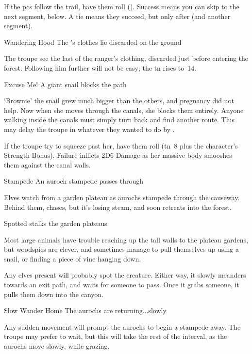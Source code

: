 If the \glspl{pc} follow the trail, have them roll  (\tn[10]).
Success means you can skip to the next \gls{segment}, below.
A tie means they succeed, but only after  (and another \gls{segment}).

{Wandering Hood}%
{The 's clothes lie discarded on the ground}%

The troupe see the last of the ranger's clothing, discarded just before entering the forest.
Following him further will not be easy; the \gls{tn} rises to~14.


{Excuse Me!}%
{A giant snail blocks the path}%

`Brownie' the snail grew much bigger than the others, and pregnancy did not help.
Now when she moves through the canals, she blocks them entirely.
Anyone walking inside the canals must simply turn back and find another route.
This may delay the troupe in whatever they wanted to do by .

If the troupe try to squeeze past her, have them roll  (\gls{tn}~8 plus the character's Strength Bonus).
Failure inflicts 2D6 Damage as her massive body smooshes them against the canal walls.

{Stampede}%
{An auroch stampede passes through}%

Elves watch from a garden plateau as aurochs stampede through the causeway.
Behind them,  chases, but it's losing steam, and soon retreats into the forest.

{ Spotted}%
{ stalks the garden plateaus}%

Most large animals have trouble reaching up the tall walls to the plateau gardens, but woodspies are clever, and sometimes manage to pull themselves up using a snail, or finding a piece of vine hanging down.

Any elves present will probably spot the creature.
Either way, it slowly meanders towards an exit path, and waits for someone to pass.
Once it grabs someone, it pulls them down into the canyon.

{Slow Wander Home}%
{The aurochs are returning...slowly}%

Any sudden movement will prompt the aurochs to begin a stampede away.
The troupe may prefer to wait, but this will take the rest of the \gls{interval}, as the aurochs move slowly, while grazing.

